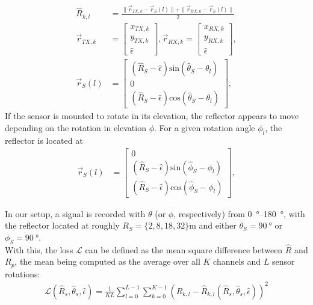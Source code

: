 \begin{align}
  \hat R_{k,l}   & = \frac{\| \vec r_{TX,k} - \vec r_S(l) \|+\| \vec r_{RX,k} - \vec r_S(l) \|}{2}
  \\
  \vec{r}_{TX,k} & = \begin{bmatrix}
                       x_{TX,k} \\ y_{TX,k} \\ \hat \epsilon
                     \end{bmatrix},
  \vec r_{RX,k}       = \begin{bmatrix}
                          x_{RX,k} \\ y_{RX,k} \\ \hat \epsilon
                        \end{bmatrix},                                                                                        \\
  \vec r_S(l)    & = \begin{bmatrix}
                       (\hat R_S-\hat \epsilon) \text{sin}(\hat \theta_S-\theta_l) \\ 0 \\ (\hat R_S-\hat \epsilon) \text{cos}(\hat \theta_S-\theta_l)
                     \end{bmatrix},
\end{align}
If the sensor is mounted to rotate in its elevation, the reflector appears to move depending on the rotation in elevation $\phi$.
For a given rotation angle $\phi_l$, the reflector is located at
\begin{align}
  \vec r_S(l) & = \begin{bmatrix}
                    0 \\ (\hat R_S-\hat \epsilon) \text{sin}(\hat \phi_S-\phi_l) \\ (\hat R_S-\hat \epsilon) \text{cos}(\hat \phi_S-\phi_l)
                  \end{bmatrix},
\end{align}

In our setup, a signal is recorded with $\theta$ (or $\phi$, respectively) from \SIrange{0}{180}{\degree},
with the reflector located at roughly $R_S = \{2,8,18,32\}\si{\meter}$ and either $\theta_S = \SI{90}{\degree}$ or $\phi_S = \SI{90}{\degree}$. \\

With this, the loss $\mathcal L$ can be defined as the mean square difference between $\hat R$ and $R_{p}$,
the mean being computed as the average over all $K$ channels and $L$ sensor rotations:
\begin{align}
  \mathcal L(\hat R_s, \hat \theta_s, \hat \epsilon)
  = \frac{1}{KL}\sum_{l=0}^{L-1} \sum_{k=0}^{K-1} ( R_{k,l} - \hat  R_{k,l}(\hat R_s, \hat \theta_s, \hat \epsilon))^2
\end{align} \\

